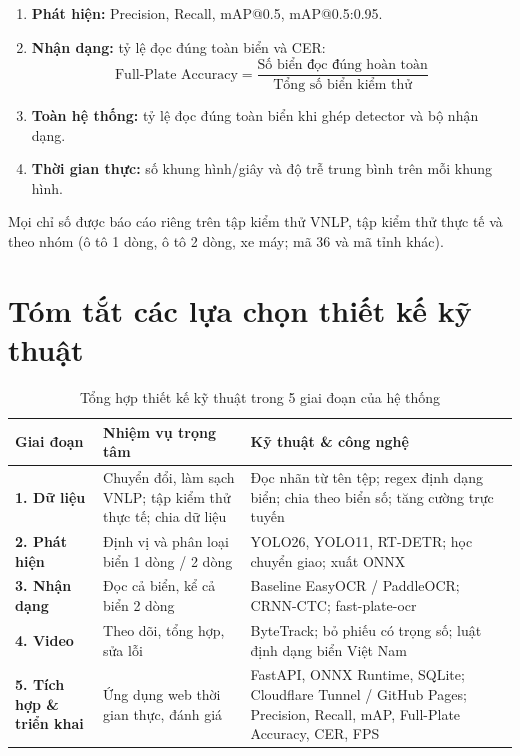 \begin{enumerate}
  \item \textbf{Phát hiện:} Precision, Recall, mAP@0.5, mAP@0.5:0.95.
  \item \textbf{Nhận dạng:} tỷ lệ đọc đúng toàn biển và CER:
  \[
    \text{Full-Plate Accuracy} = \frac{\text{Số biển đọc đúng hoàn toàn}}{\text{Tổng số biển kiểm thử}}
  \]
  \item \textbf{Toàn hệ thống:} tỷ lệ đọc đúng toàn biển khi ghép detector và bộ nhận dạng.
  \item \textbf{Thời gian thực:} số khung hình/giây và độ trễ trung bình trên mỗi khung hình.
\end{enumerate}

Mọi chỉ số được báo cáo riêng trên tập kiểm thử VNLP, tập kiểm thử thực tế và theo nhóm (ô tô 1 dòng, ô tô 2 dòng, xe máy; mã 36 và mã tỉnh khác).

\section{Tóm tắt các lựa chọn thiết kế kỹ thuật}

\begin{table}[H]
\centering
\small
\begin{tabularx}{\textwidth}{|>{\RaggedRight\bfseries}p{2.8cm}|>{\RaggedRight}p{4.4cm}|>{\RaggedRight\arraybackslash}X|}
\hline
\textbf{Giai đoạn} & \textbf{Nhiệm vụ trọng tâm} & \textbf{Kỹ thuật \& công nghệ} \\
\hline
1. Dữ liệu & Chuyển đổi, làm sạch VNLP; tập kiểm thử thực tế; chia dữ liệu & Đọc nhãn từ tên tệp; regex định dạng biển; chia theo biển số; tăng cường trực tuyến \\
\hline
2. Phát hiện & Định vị và phân loại biển 1 dòng / 2 dòng & YOLO26, YOLO11, RT-DETR; học chuyển giao; xuất ONNX \\
\hline
3. Nhận dạng & Đọc cả biển, kể cả biển 2 dòng & Baseline EasyOCR / PaddleOCR; CRNN-CTC; fast-plate-ocr \\
\hline
4. Video & Theo dõi, tổng hợp, sửa lỗi & ByteTrack; bỏ phiếu có trọng số; luật định dạng biển Việt Nam \\
\hline
5. Tích hợp \& triển khai & Ứng dụng web thời gian thực, đánh giá & FastAPI, ONNX Runtime, SQLite; Cloudflare Tunnel / GitHub Pages; Precision, Recall, mAP, Full-Plate Accuracy, CER, FPS \\
\hline
\end{tabularx}
\caption{Tổng hợp thiết kế kỹ thuật trong 5 giai đoạn của hệ thống}
\label{tab:design_summary}
\end{table}
